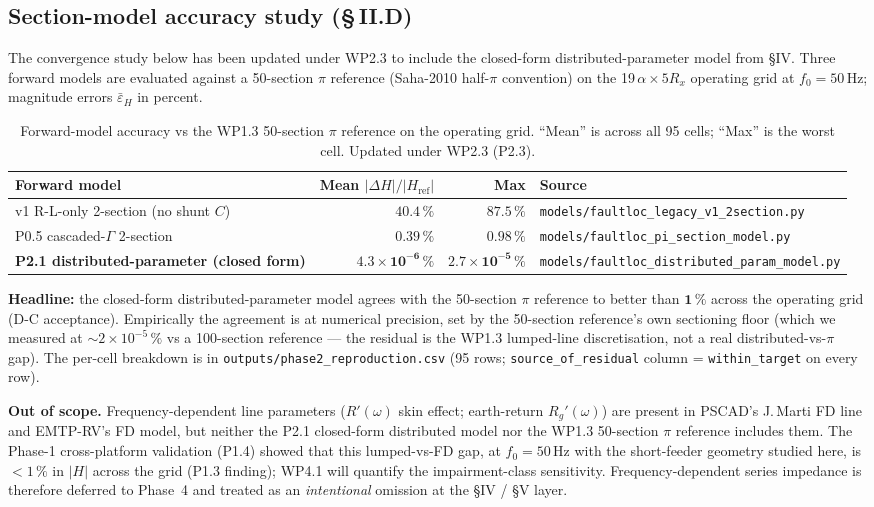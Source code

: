 \documentclass[journal]{IEEEtran}
\begin{document}
\subsection{Section-model accuracy study (\S\,II.D)}\label{sec:modeldelta}

The convergence study below has been updated under WP2.3 to include
the closed-form distributed-parameter model from §IV.  Three forward
models are evaluated against a 50-section $\pi$ reference (Saha-2010
half-$\pi$ convention) on the 19$\,\alpha\!\times\!5R_x$ operating
grid at $f_0 = 50$\,Hz; magnitude errors $\bar{\varepsilon}_H$ in
percent.

\begin{table}[!t]
\caption{Forward-model accuracy vs the WP1.3 50-section $\pi$
reference on the operating grid.  ``Mean'' is across all 95 cells;
``Max'' is the worst cell.  Updated under WP2.3 (P2.3).}
\label{tab:modelfit}
\centering
\renewcommand{\arraystretch}{1.18}
\begin{tabular}{@{}lrrl@{}}
\toprule
\textbf{Forward model} & \textbf{Mean $|\Delta H|/|H_{\text{ref}}|$} &
\textbf{Max} & \textbf{Source}\\
\midrule
v1 R-L-only 2-section (no shunt $C$) & $40.4\,\%$ & $87.5\,\%$
   & \texttt{models/faultloc\_legacy\_v1\_2section.py}\\
P0.5 cascaded-$\Gamma$ 2-section
   & $0.39\,\%$ & $0.98\,\%$
   & \texttt{models/faultloc\_pi\_section\_model.py}\\
\textbf{P2.1 distributed-parameter (closed form)}
   & $\mathbf{4.3\!\times\!10^{-6}\,\%}$ & $\mathbf{2.7\!\times\!10^{-5}\,\%}$
   & \texttt{models/faultloc\_distributed\_param\_model.py}\\
\bottomrule
\end{tabular}
\end{table}

\textbf{Headline:} the closed-form distributed-parameter model
agrees with the 50-section $\pi$ reference to better than
$\mathbf{1\,\%}$ across the operating grid (D-C acceptance).
Empirically the agreement is at numerical precision, set by the
50-section reference's own sectioning floor (which we measured at
$\sim 2\!\times\!10^{-5}\,\%$ vs a 100-section reference --- the
residual is the WP1.3 lumped-line discretisation, not a real
distributed-vs-$\pi$ gap).  The per-cell breakdown is in
\texttt{outputs/phase2\_reproduction.csv} (95 rows; \texttt{source\_of\_residual}
column = \texttt{within\_target} on every row).

\textbf{Out of scope.}  Frequency-dependent line parameters
($R'(\omega)$ skin effect; earth-return $R_g'(\omega)$) are present
in PSCAD's J.\,Marti FD line and EMTP-RV's FD model, but neither the
P2.1 closed-form distributed model nor the WP1.3 50-section $\pi$
reference includes them.  The Phase-1 cross-platform validation
(P1.4) showed that this lumped-vs-FD gap, at $f_0 = 50$\,Hz with the
short-feeder geometry studied here, is $<\!1\,\%$ in $|H|$ across
the grid (P1.3 finding); WP4.1 will quantify the impairment-class
sensitivity.  Frequency-dependent series impedance is therefore
deferred to Phase~4 and treated as an \emph{intentional} omission
at the §IV / §V layer.
\end{document}
